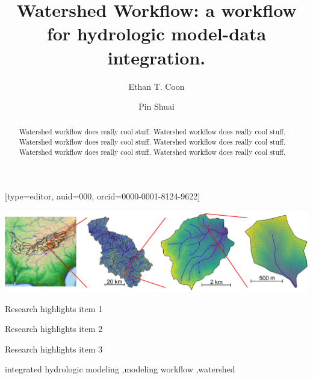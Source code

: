 \documentclass[a4paper,fleqn]{cas-dc}
\begin{document}
\let\WriteBookmarks\relax
\def\floatpagepagefraction{1}
\def\textpagefraction{.001}

\title [mode = title]{Watershed Workflow: a workflow for hydrologic model-data integration.}                      
\tnotemark[1]


\author[1]{Ethan T. Coon}[type=editor,
                      auid=000,
                      orcid=0000-0001-8124-9622]
\cormark[1]
\address[1]{Climate Change Science Institute \& Environmental Sciences Division, Oak Ridge National Laboratory, 1 Bethel Valley Road, Oak Ridge, TN, 37830, USA}

\author[2]{Pin Shuai}
\address[2]{Pacific Northwest National Laboratory}

\begin{abstract}
Watershed workflow does really cool stuff.
Watershed workflow does really cool stuff.
Watershed workflow does really cool stuff.
Watershed workflow does really cool stuff.
Watershed workflow does really cool stuff.
Watershed workflow does really cool stuff.
\end{abstract}

\begin{graphicalabstract}
\includegraphics[width=\textwidth]{figs2/watersheds/watershed_workflow.png}
\end{graphicalabstract}

\begin{highlights}
\item Research highlights item 1
\item Research highlights item 2
\item Research highlights item 3
\end{highlights}

\begin{keywords}
integrated hydrologic modeling \sep modeling workflow \sep watershed 
\end{keywords}
\end{document}
